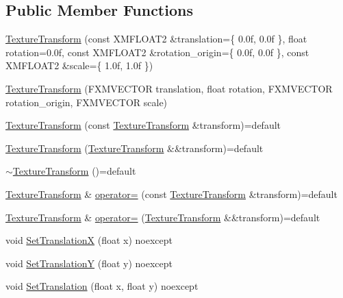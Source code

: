 \subsection*{Public Member Functions}
\begin{DoxyCompactItemize}
\item 
\hyperlink{structmage_1_1_texture_transform_a345bc55a1ce23cf5febd583ae9c37702}{Texture\+Transform} (const X\+M\+F\+L\+O\+A\+T2 \&translation=\{ 0.\+0f, 0.\+0f \}, float rotation=0.\+0f, const X\+M\+F\+L\+O\+A\+T2 \&rotation\+\_\+origin=\{ 0.\+0f, 0.\+0f \}, const X\+M\+F\+L\+O\+A\+T2 \&scale=\{ 1.\+0f, 1.\+0f \})
\item 
\hyperlink{structmage_1_1_texture_transform_a001c2baf1ae101e0714c1f9d4ef613bd}{Texture\+Transform} (F\+X\+M\+V\+E\+C\+T\+OR translation, float rotation, F\+X\+M\+V\+E\+C\+T\+OR rotation\+\_\+origin, F\+X\+M\+V\+E\+C\+T\+OR scale)
\item 
\hyperlink{structmage_1_1_texture_transform_ae9805a51cc43bd89a4bf94ac0ac49ae2}{Texture\+Transform} (const \hyperlink{structmage_1_1_texture_transform}{Texture\+Transform} \&transform)=default
\item 
\hyperlink{structmage_1_1_texture_transform_aa0b4bd0dedfdf0351cb01d056533c984}{Texture\+Transform} (\hyperlink{structmage_1_1_texture_transform}{Texture\+Transform} \&\&transform)=default
\item 
\hyperlink{structmage_1_1_texture_transform_afb608ccc7bc107b893ea68937529a901}{$\sim$\+Texture\+Transform} ()=default
\item 
\hyperlink{structmage_1_1_texture_transform}{Texture\+Transform} \& \hyperlink{structmage_1_1_texture_transform_a0166da366dcf3054db133dda5867cf87}{operator=} (const \hyperlink{structmage_1_1_texture_transform}{Texture\+Transform} \&transform)=default
\item 
\hyperlink{structmage_1_1_texture_transform}{Texture\+Transform} \& \hyperlink{structmage_1_1_texture_transform_a82adfc646b3467f33d92f7f2e24bf28e}{operator=} (\hyperlink{structmage_1_1_texture_transform}{Texture\+Transform} \&\&transform)=default
\item 
void \hyperlink{structmage_1_1_texture_transform_a0950831357b1143222b3090c1dea4038}{Set\+TranslationX} (float x) noexcept
\item 
void \hyperlink{structmage_1_1_texture_transform_ae1a7ddbc2f5ea07e952dcdf0256a522a}{Set\+TranslationY} (float y) noexcept
\item 
void \hyperlink{structmage_1_1_texture_transform_a2d7d69662b4d36be31afa92c21055a36}{Set\+Translation} (float x, float y) noexcept

\end{DoxyCompactItemize}
